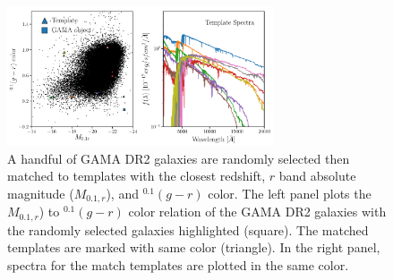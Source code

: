 \documentclass[12pt, letterpaper, preprint]{aastex}
\begin{document}
\begin{figure}
\begin{center}
\includegraphics[width=0.7\textwidth]{figs/GamaLegacy_matchedtempSpectra.pdf}
    \caption{A handful of GAMA DR2 galaxies are randomly selected then 
    matched to templates with the closest redshift, $r$ band absolute 
    magnitude ($M_{0.1,r}$), and $^{0.1}(g - r)$ color. The left panel
    plots the $M_{0.1,r}$) to $^{0.1}(g - r)$ color relation of the GAMA
    DR2 galaxies with the randomly selected galaxies highlighted (square). 
    The matched templates are marked with same color (triangle). In the 
    right panel, spectra for the match templates are plotted in the same 
    color.}
\label{fig:temp_spectra}
\end{center}
\end{figure}
%
\end{document}

